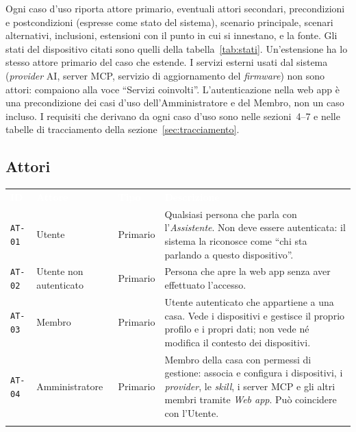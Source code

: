 \documentclass[12pt,a4paper]{article}
\newcommand{\thc}[1]{\textcolor{white}{\textbf{#1}}}
\newcommand{\rl}{\\ \arrayrulecolor{bfline}\hline}
\begin{document}
Ogni caso d'uso riporta attore primario, eventuali attori secondari, precondizioni e postcondizioni (espresse come stato del sistema), scenario principale, scenari alternativi, inclusioni, estensioni con il punto in cui si innestano, e la fonte. Gli stati del dispositivo citati sono quelli della tabella~\ref{tab:stati}. Un'estensione ha lo stesso attore primario del caso che estende. I servizi esterni usati dal sistema (\emph{provider} AI, server MCP, servizio di aggiornamento del \emph{firmware}) non sono attori: compaiono alla voce ``Servizi coinvolti''. L'autenticazione nella web app è una precondizione dei casi d'uso dell'Amministratore e del Membro, non un caso incluso. I requisiti che derivano da ogni caso d'uso sono nelle sezioni~4--7 e nelle tabelle di tracciamento della sezione~\ref{sec:tracciamento}.



\subsection{Attori}

\begin{center}

\begin{tabularx}{\linewidth}{>{\hsize=0.40\hsize\raggedright\arraybackslash}X >{\hsize=0.80\hsize\raggedright\arraybackslash}X >{\hsize=0.80\hsize\raggedright\arraybackslash}X >{\hsize=2.00\hsize\raggedright\arraybackslash}X}

\rowcolor{bfblue}\thc{ID} & \thc{Attore} & \thc{Tipo} & \thc{Descrizione} \\

\texttt{AT-01} & Utente & Primario & Qualsiasi persona che parla con l'\textit{Assistente}. Non deve essere autenticata: il sistema la riconosce come ``chi sta parlando a questo dispositivo''. \rl

\texttt{AT-02} & Utente non autenticato & Primario & Persona che apre la web app senza aver effettuato l'accesso. \rl

\texttt{AT-03} & Membro & Primario & Utente autenticato che appartiene a una casa. Vede i dispositivi e gestisce il proprio profilo e i propri dati; non vede né modifica il contesto dei dispositivi. \rl

\texttt{AT-04} & Amministratore & Primario & Membro della casa con permessi di gestione: associa e configura i dispositivi, i \textit{provider}, le \textit{skill}, i server MCP e gli altri membri tramite \textit{Web app}. Può coincidere con l'Utente. \rl

\end{tabularx}

\end{center}
\end{document}
